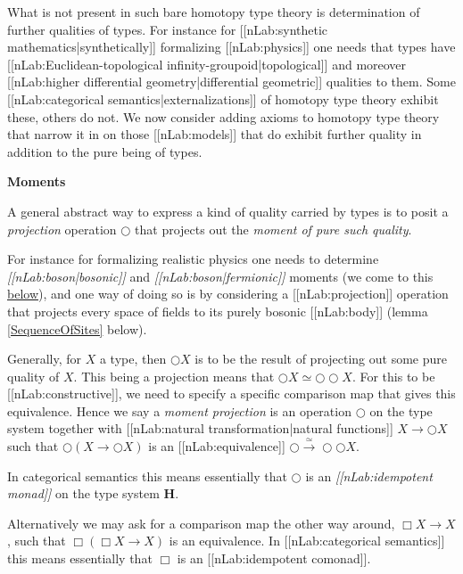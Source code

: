 \documentclass[12pt,titlepage]{article}
\theoremstyle{plain}
\theoremstyle{definition}
\theoremstyle{remark}
\begin{document}
What is not present in such bare homotopy type theory is determination of further qualities of types. For instance for [[nLab:synthetic mathematics|synthetically]] formalizing [[nLab:physics]] one needs that types have [[nLab:Euclidean-topological infinity-groupoid|topological]] and moreover [[nLab:higher differential geometry|differential geometric]] qualities to them. Some [[nLab:categorical semantics|externalizations]] of homotopy type theory exhibit these, others do not. We now consider adding axioms to homotopy type theory that narrow it in on those [[nLab:models]] that do exhibit further quality in addition to the pure being of types.

\textbf{Moments}

A general abstract way to express a kind of quality carried by types is to posit a \emph{projection} operation $\bigcirc$ that projects out the \emph{moment of pure such quality}.

For instance for formalizing realistic physics one needs to determine \emph{[[nLab:boson|bosonic]]} and \emph{[[nLab:boson|fermionic]]} moments (we come to this \hyperlink{Externalization}{below}), and one way of doing so is by considering a [[nLab:projection]] operation that projects every space of fields to its purely bosonic [[nLab:body]] (lemma \ref{SequenceOfSites} below).

Generally, for $X$ a type, then $\bigcirc X$ is to be the result of projecting out some pure quality of $X$. This being a projection means that $\bigcirc X  \simeq \bigcirc \bigcirc X$. For this to be [[nLab:constructive]], we need to specify a specific comparison map that gives this equivalence. Hence we say a \emph{moment projection} is an operation $\bigcirc$ on the type system together with [[nLab:natural transformation|natural functions]] $X \to \bigcirc X$ such that $\bigcirc(X \to \bigcirc X)$ is an [[nLab:equivalence]] $\bigcirc \stackrel{\simeq}{\longrightarrow} \bigcirc \bigcirc X$.

In categorical semantics this means essentially that $\bigcirc$ is an \emph{[[nLab:idempotent monad]]} on the type system $\mathbf{H}$.

Alternatively we may ask for a comparison map the other way around, $\Box X \longrightarrow X$, such that $\Box(\Box X \longrightarrow X)$ is an equivalence. In [[nLab:categorical semantics]] this means essentially that $\Box$ is an [[nLab:idempotent comonad]].
\end{document}

